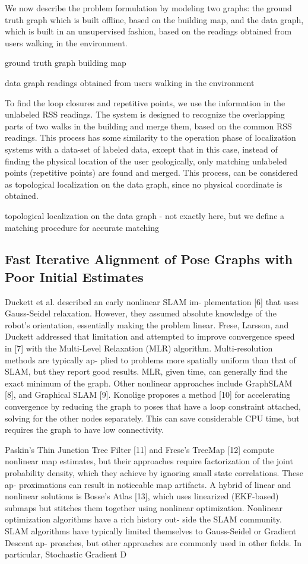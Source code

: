 \documentclass[conference]{IEEEtran}
\begin{document}
We now describe the problem formulation by modeling two graphs: the ground truth graph which is built offline, based on the building map, and the data graph, which is built in an unsupervised fashion, based on the readings obtained from users walking in the environment.

ground truth graph
building map

data graph
readings obtained from users walking in the environment

To find the loop closures and repetitive points, we use the information in the unlabeled RSS readings. The system is designed to recognize the overlapping parts of two walks in the building and merge them, based on the common RSS readings. This process has some similarity to the operation phase of localization systems with a data-set of labeled data, except that in this case, instead of finding the physical location of the user geologically, only matching unlabeled points (repetitive points) are found and merged. This process, can be considered as topological localization on the data graph, since no physical coordinate is obtained.

topological localization on the data graph - not exactly here, but we define a matching procedure for accurate matching


\subsection{Fast Iterative Alignment of Pose Graphs with Poor Initial Estimates}

Duckett et al. described an early nonlinear SLAM im- plementation [6] that uses Gauss-Seidel relaxation. However, they assumed absolute knowledge of the robot’s orientation, essentially making the problem linear. Frese, Larsson, and Duckett addressed that limitation and attempted to improve convergence speed in [7] with the Multi-Level Relaxation (MLR) algorithm. Multi-resolution methods are typically ap- plied to problems more spatially uniform than that of SLAM, but they report good results. MLR, given time, can generally find the exact minimum of the graph. Other nonlinear approaches include GraphSLAM [8], and Graphical SLAM [9]. Konolige proposes a method [10] for accelerating convergence by reducing the graph to poses that have a loop constraint attached, solving for the other nodes separately. This can save considerable CPU time, but requires the graph to have low connectivity.

Paskin’s Thin Junction Tree Filter [11] and Frese’s TreeMap [12] compute nonlinear map estimates, but their approaches require factorization of the joint probability density, which they achieve by ignoring small state correlations. These ap- proximations can result in noticeable map artifacts. A hybrid of linear and nonlinear solutions is Bosse’s Atlas [13], which uses linearized (EKF-based) submaps but stitches them together using nonlinear optimization. Nonlinear optimization algorithms have a rich history out- side the SLAM community. SLAM algorithms have typically limited themselves to Gauss-Seidel or Gradient Descent ap- proaches, but other approaches are commonly used in other fields. In particular, Stochastic Gradient D
\end{document}
